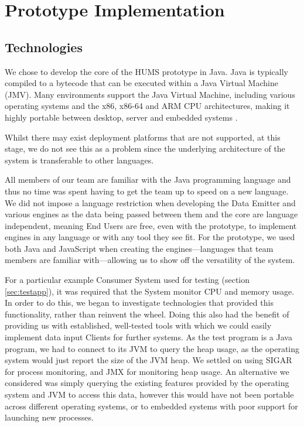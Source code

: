 \documentclass[10pt,a4paper]{article}
\begin{document}
\section{Prototype Implementation}
\label{sec:prototype}

\subsection{Technologies}

We chose to develop the core of the HUMS prototype in Java. Java is typically
compiled to a bytecode that can be executed within a Java Virtual Machine (JMV).
Many environments support the Java Virtual Machine, including various
operating systems and the x86, x86-64 and ARM CPU architectures,
making it highly portable between desktop, server and embedded
systems \cite{javasupport}.

Whilst there may exist deployment platforms that are not supported, at
this stage, we do not see this as a problem since the underlying
architecture of the system is transferable to other languages.

All members of our team are familiar with the Java programming
language and thus no time was spent having to get the team up to speed
on a new language. We did not impose a language restriction when
developing the Data Emitter and various engines as the data being
passed between them and the core are language independent, meaning 
End Users are free, even with the prototype, to implement engines in any
language or with any tool they see fit. For the prototype, we used both Java and
JavaScript when creating the engines---languages that team members are
familiar with---allowing us to show off the versatility of the system.

For a particular example Consumer System used for testing (section
\ref{sec:testapp}), it was required that the System monitor CPU and memory usage.
In order to do this, we began to investigate
technologies that provided this functionality, rather than reinvent the wheel.
Doing this also had the benefit of providing us with established, well-tested
tools with which we could easily implement data input Clients for further
systems. As the test program is a Java program, we had to connect to its 
JVM to query the heap usage, as the operating system would just report the 
size of the JVM heap. We settled on using SIGAR for process monitoring, 
and JMX for monitoring heap usage. An alternative we considered was 
simply querying the existing features provided by the operating system 
and JVM to access this data, however this would have not been portable 
across different operating systems, or to embedded systems with poor 
support for launching new processes.
\end{document}
